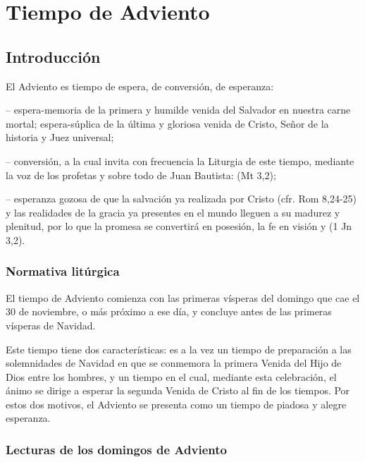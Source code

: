 \part{Tiempo de Adviento}

\chapter{Introducción}

\begin{introstyle}
	
	El Adviento es tiempo de espera, de conversión, de esperanza\label{fn2}:
	
	-- espera-memoria de la primera y humilde venida del Salvador en nuestra carne mortal; espera-súplica de la última y gloriosa venida de Cristo, Señor de la historia y Juez universal;
	
	-- conversión, a la cual invita con frecuencia la Liturgia de este tiempo, mediante la voz de los profetas y sobre todo de Juan Bautista:  (Mt 3,2);
	
	-- esperanza gozosa de que la salvación ya realizada por Cristo (cfr. Rom 8,24-25) y las realidades de la gracia ya presentes en el mundo lleguen a su madurez y plenitud, por lo que la promesa se convertirá en posesión, la fe en visión y  (1 Jn 3,2).
	
	\section{Normativa litúrgica}
	El tiempo de Adviento comienza con las primeras vísperas del domingo que cae el 30 de noviembre, o más próximo a ese día, y concluye antes de las primeras vísperas de Navidad\label{fn3}.
	
	Este tiempo tiene dos características: es a la vez un tiempo de preparación a las solemnidades de Navidad en que se conmemora la primera Venida del Hijo de Dios entre los hombres, y un tiempo en el cual, mediante esta celebración, el ánimo se dirige a esperar la segunda Venida de Cristo al fin de los tiempos. Por estos dos motivos, el Adviento se presenta como un tiempo de piadosa y alegre esperanza.
	
	\newpage
	\section{Lecturas de los domingos de Adviento}
	

\end{introstyle}
